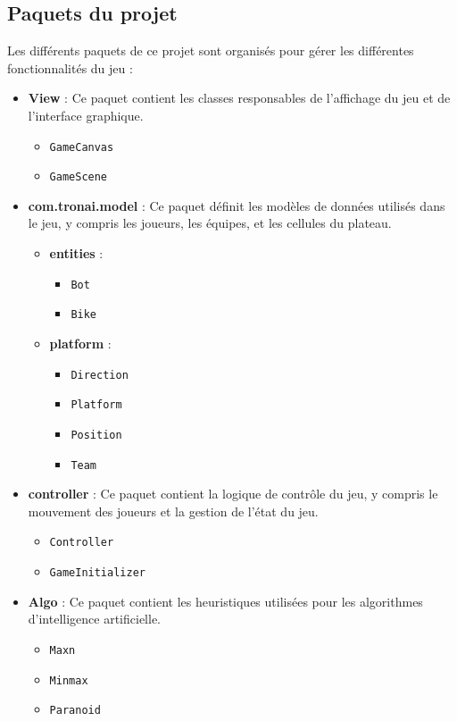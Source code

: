 \documentclass[a4paper,12pt]{article}
\begin{document}
\subsection{Paquets du projet}
Les différents paquets de ce projet sont organisés pour gérer les différentes fonctionnalités du jeu :

\begin{itemize}
    \item \textbf{View} : Ce paquet contient les classes responsables de l’affichage du jeu et de l’interface graphique.
    \begin{itemize}
        \item \texttt{GameCanvas}
        \item \texttt{GameScene}
    \end{itemize}
    
    \item \textbf{com.tronai.model} : Ce paquet définit les modèles de données utilisés dans le jeu, y compris les joueurs, les équipes, et les cellules du plateau.
    \begin{itemize}
        \item \textbf{entities} :
        \begin{itemize}
            \item \texttt{Bot}
            \item \texttt{Bike}
        \end{itemize}
        \item \textbf{platform} :
        \begin{itemize}
            \item \texttt{Direction}
            \item \texttt{Platform}
            \item \texttt{Position}
            \item \texttt{Team}
        \end{itemize}
    \end{itemize}
    
    \item \textbf{controller} : Ce paquet contient la logique de contrôle du jeu, y compris le mouvement des joueurs et la gestion de l’état du jeu.
    \begin{itemize}
        \item \texttt{Controller}
        \item \texttt{GameInitializer}
    \end{itemize}
    
    \item \textbf{Algo} : Ce paquet contient les heuristiques utilisées pour les algorithmes d’intelligence artificielle.
    \begin{itemize}
        \item \texttt{Maxn}
        \item \texttt{Minmax}
        \item \texttt{Paranoid}
    \end{itemize}
    

\end{itemize}
\end{document}
